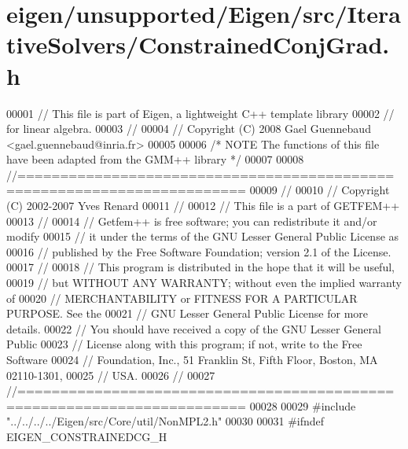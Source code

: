 \hypertarget{eigen_2unsupported_2_eigen_2src_2_iterative_solvers_2_constrained_conj_grad_8h_source}{}\section{eigen/unsupported/\+Eigen/src/\+Iterative\+Solvers/\+Constrained\+Conj\+Grad.h}
\label{eigen_2unsupported_2_eigen_2src_2_iterative_solvers_2_constrained_conj_grad_8h_source}

\begin{DoxyCode}
00001 \textcolor{comment}{// This file is part of Eigen, a lightweight C++ template library}
00002 \textcolor{comment}{// for linear algebra.}
00003 \textcolor{comment}{//}
00004 \textcolor{comment}{// Copyright (C) 2008 Gael Guennebaud <gael.guennebaud@inria.fr>}
00005 
00006 \textcolor{comment}{/* NOTE The functions of this file have been adapted from the GMM++ library */}
00007 
00008 \textcolor{comment}{//========================================================================}
00009 \textcolor{comment}{//}
00010 \textcolor{comment}{// Copyright (C) 2002-2007 Yves Renard}
00011 \textcolor{comment}{//}
00012 \textcolor{comment}{// This file is a part of GETFEM++}
00013 \textcolor{comment}{//}
00014 \textcolor{comment}{// Getfem++ is free software; you can redistribute it and/or modify}
00015 \textcolor{comment}{// it under the terms of the GNU Lesser General Public License as}
00016 \textcolor{comment}{// published by the Free Software Foundation; version 2.1 of the License.}
00017 \textcolor{comment}{//}
00018 \textcolor{comment}{// This program is distributed in the hope that it will be useful,}
00019 \textcolor{comment}{// but WITHOUT ANY WARRANTY; without even the implied warranty of}
00020 \textcolor{comment}{// MERCHANTABILITY or FITNESS FOR A PARTICULAR PURPOSE.  See the}
00021 \textcolor{comment}{// GNU Lesser General Public License for more details.}
00022 \textcolor{comment}{// You should have received a copy of the GNU Lesser General Public}
00023 \textcolor{comment}{// License along with this program; if not, write to the Free Software}
00024 \textcolor{comment}{// Foundation, Inc., 51 Franklin St, Fifth Floor, Boston, MA  02110-1301,}
00025 \textcolor{comment}{// USA.}
00026 \textcolor{comment}{//}
00027 \textcolor{comment}{//========================================================================}
00028 
00029 \textcolor{preprocessor}{#include "../../../../Eigen/src/Core/util/NonMPL2.h"}
00030 
00031 \textcolor{preprocessor}{#ifndef EIGEN\_CONSTRAINEDCG\_H}

\end{DoxyCode}
